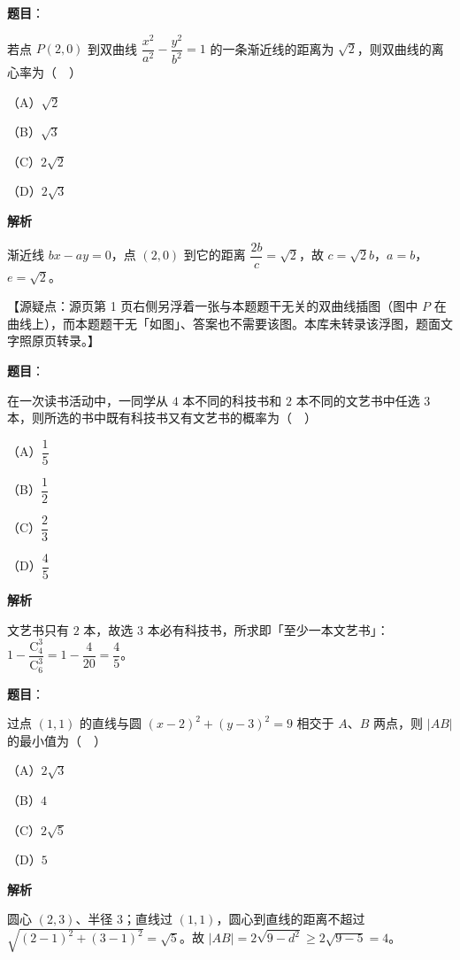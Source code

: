 \begin{answer}

\textbf{题目}：

若点 $P(2,0)$ 到双曲线 $\dfrac{x^2}{a^2}-\dfrac{y^2}{b^2}=1$ 的一条渐近线的距离为 $\sqrt2$，则双曲线的离心率为（　）

（A）$\sqrt2$

（B）$\sqrt3$

（C）$2\sqrt2$

（D）$2\sqrt3$

\textbf{解析}

渐近线 $bx-ay=0$，点 $(2,0)$ 到它的距离 $\dfrac{2b}{c}=\sqrt2$，故 $c=\sqrt2b$，$a=b$，$e=\sqrt2$。

【源疑点：源页第 1 页右侧另浮着一张与本题题干无关的双曲线插图（图中 $P$ 在曲线上），而本题题干无「如图」、答案也不需要该图。本库未转录该浮图，题面文字照原页转录。】


\end{answer}
\begin{answer}

\textbf{题目}：

在一次读书活动中，一同学从 $4$ 本不同的科技书和 $2$ 本不同的文艺书中任选 $3$ 本，则所选的书中既有科技书又有文艺书的概率为（　）

（A）$\dfrac15$

（B）$\dfrac12$

（C）$\dfrac23$

（D）$\dfrac45$

\textbf{解析}

文艺书只有 $2$ 本，故选 $3$ 本必有科技书，所求即「至少一本文艺书」：$1-\dfrac{\mathrm C_4^3}{\mathrm C_6^3}=1-\dfrac4{20}=\dfrac45$。


\end{answer}
\begin{answer}

\textbf{题目}：

过点 $(1,1)$ 的直线与圆 $(x-2)^2+(y-3)^2=9$ 相交于 $A$、$B$ 两点，则 $|AB|$ 的最小值为（　）

（A）$2\sqrt3$

（B）$4$

（C）$2\sqrt5$

（D）$5$

\textbf{解析}

圆心 $(2,3)$、半径 $3$；直线过 $(1,1)$，圆心到直线的距离不超过 $\sqrt{(2-1)^2+(3-1)^2}=\sqrt5$。故 $|AB|=2\sqrt{9-d^2}\geqslant2\sqrt{9-5}=4$。


\end{answer}
